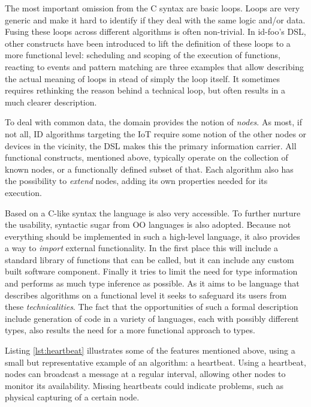 \documentclass[conference]{IEEEtran}
\newcommand{\NAME}{id-foo\xspace}
\begin{document}
The most important omission from the C syntax are basic loops. Loops are very
generic and make it hard to identify if they deal with the same logic and/or
data. Fusing these loops across different algorithms is often non-trivial. In
\NAME's DSL, other constructs have been introduced to lift the definition of
these loops to a more functional level: scheduling and scoping of the execution
of functions, reacting to events and pattern matching are three examples that
allow describing the actual meaning of loops in stead of simply the loop
itself. It sometimes requires rethinking the reason behind a technical loop,
but often results in a much clearer description.

To deal with common data, the domain provides the notion of \emph{nodes}. As
most, if not all, ID algorithms targeting the IoT require some notion of the
other nodes or devices in the vicinity, the DSL makes this the primary
information carrier. All functional constructs, mentioned above, typically
operate on the collection of known nodes, or a functionally defined subset of
that. Each algorithm also has the possibility to \emph{extend} nodes, adding
its own properties needed for its execution.

Based on a C-like syntax the language is also very accessible. To further
nurture the usability, syntactic sugar from OO languages is also adopted.
Because not everything should be implemented in such a high-level language, it
also provides a way to \emph{import} external functionality. In the first place
this will include a standard library of functions that can be called, but it
can include any custom built software component. Finally it tries to limit the
need for type information and performs as much type inference as possible. As
it aims to be language that describes algorithms on a functional level it seeks
to safeguard its users from these \emph{technicalities}. The fact that the
opportunities of such a formal description include generation of code in a
variety of languages, each with possibly different types, also results the need
for a more functional approach to types.

Listing \ref{lst:heartbeat} illustrates some of the features mentioned above,
using a small but representative example of an algorithm: a heartbeat. Using a
heartbeat, nodes can broadcast a message at a regular interval, allowing other
nodes to monitor its availability. Missing heartbeats could indicate problems,
such as physical capturing of a certain node.


\end{document}
